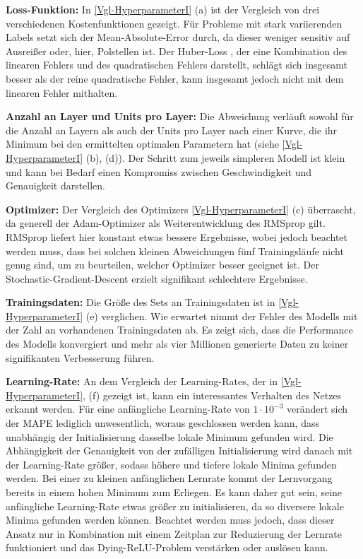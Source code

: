 \textbf{Loss-Funktion:}
In \textsf{\autoref{Vgl-HyperparameterI} (a)}  ist der Vergleich von drei verschiedenen Kostenfunktionen gezeigt. Für Probleme mit stark variierenden Labels setzt sich der Mean-Absolute-Error durch, da dieser weniger sensitiv auf Ausreißer oder, hier, Polstellen ist. Der Huber-Loss \cite{huber}, der eine Kombination des linearen Fehlers und des quadratischen Fehlers darstellt, schlägt sich insgesamt besser als der reine quadratische Fehler, kann insgesamt jedoch nicht mit dem linearen Fehler mithalten. 

\textbf{Anzahl an Layer und Units pro Layer:}
Die Abweichung verläuft sowohl für die Anzahl an Layern als auch der Units pro Layer nach einer Kurve, die ihr Minimum bei den ermittelten optimalen Parametern hat (siehe \textsf{\autoref{Vgl-HyperparameterI} (b), (d)}). Der Schritt zum jeweils simpleren Modell ist klein und kann bei Bedarf einen Kompromiss zwischen Geschwindigkeit und Genauigkeit darstellen. 

\textbf{Optimizer:} Der Vergleich des Optimizers \textsf{\autoref{Vgl-HyperparameterI} (c)} überrascht, da generell der Adam-Optimizer \cite{Adam} als Weiterentwicklung des RMSprop \cite{RMSprop} gilt. RMSprop liefert hier konstant etwas bessere Ergebnisse, wobei jedoch beachtet werden muss, dass bei solchen kleinen Abweichungen fünf Trainingsläufe nicht genug sind, um zu beurteilen, welcher Optimizer besser geeignet ist. Der Stochastic-Gradient-Descent erzielt signifikant schlechtere Ergebnisse. 

\textbf{Trainingsdaten:}
Die Größe des Sets an Trainingsdaten ist in \textsf{\autoref{Vgl-HyperparameterI} (e)}  verglichen. Wie erwartet nimmt der Fehler des Modells mit der Zahl an vorhandenen Trainingsdaten ab. Es zeigt sich, dass die Performance des Modells konvergiert und mehr als vier Millionen generierte Daten zu keiner signifikanten Verbesserung führen. 

\textbf{Learning-Rate:}
An dem Vergleich der Learning-Rates, der in \textsf{\autoref{Vgl-HyperparameterI}, (f)} gezeigt ist, kann ein interessantes Verhalten des Netzes erkannt werden. Für eine anfängliche Learning-Rate von $1 \cdot 10^{-3}$ verändert sich der MAPE lediglich unwesentlich, woraus geschlossen werden kann, dass unabhängig der Initialisierung dasselbe lokale Minimum gefunden wird. Die Abhängigkeit der Genauigkeit von der zufälligen Initialisierung wird danach mit der Learning-Rate größer, sodass höhere und tiefere lokale Minima gefunden werden. Bei einer zu kleinen anfänglichen Lernrate kommt der Lernvorgang bereits in einem hohen Minimum zum Erliegen. Es kann daher gut sein, seine anfängliche Learning-Rate etwas größer zu initialisieren, da so diversere lokale Minima gefunden werden können. Beachtet werden muss jedoch, dass dieser Ansatz nur in Kombination mit einem Zeitplan zur Reduzierung der Lernrate funktioniert und das Dying-ReLU-Problem verstärken oder auslösen kann. 
 
